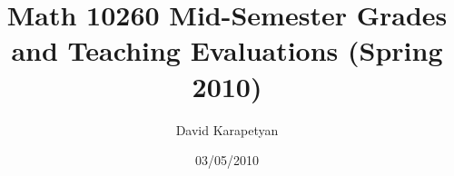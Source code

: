 \documentclass[12pt]{amsart}
\begin{document}
\title{Math 10260 Mid-Semester Grades and Teaching Evaluations (Spring 2010)}
\author{David Karapetyan}
				  \date{03/05/2010}
				  \maketitle
\end{document}
